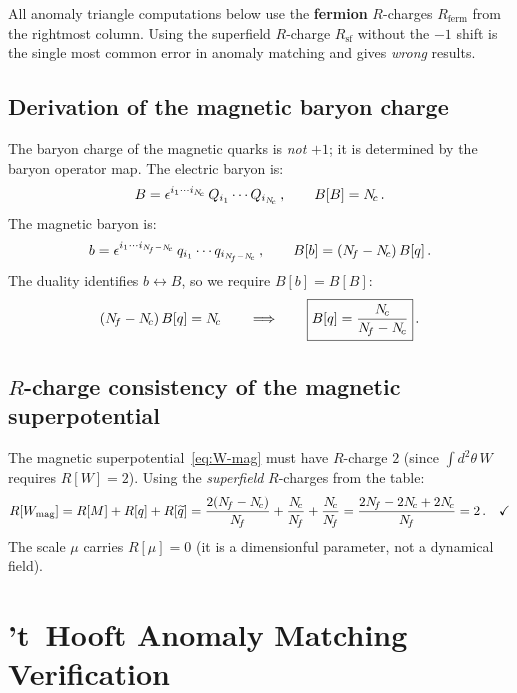 \documentclass[11pt,a4paper]{article}
\begin{document}
\begin{warningbox}[title={Fermion $R$-charges in anomaly matching}]
  All anomaly triangle computations below use the \textbf{fermion} $R$-charges
  $R_{\text{ferm}}$ from the rightmost column.
  Using the superfield $R$-charge $R_{\text{sf}}$ without the $-1$ shift is the
  single most common error in anomaly matching and gives \emph{wrong} results.
\end{warningbox}

\subsection{Derivation of the magnetic baryon charge}

The baryon charge of the magnetic quarks is \emph{not} $+1$; it is determined
by the baryon operator map.  The electric baryon is:
\[
  B = \epsilon^{i_1 \cdots i_{N_{\!c}}}\, Q_{i_1} \cdots Q_{i_{N_{\!c}}}\,,
  \qquad B[B] = N_{\!c}\,.
\]
The magnetic baryon is:
\[
  b = \epsilon^{i_1 \cdots i_{N_{\!f} - N_{\!c}}}\, q_{i_1} \cdots q_{i_{N_{\!f} - N_{\!c}}}\,,
  \qquad B[b] = (N_{\!f} - N_{\!c})\,B[q]\,.
\]
The duality identifies $b \leftrightarrow B$, so we require $B[b] = B[B]$:
\begin{equation}\label{eq:B-charge-q}
  (N_{\!f} - N_{\!c})\,B[q] = N_{\!c}
  \qquad\Longrightarrow\qquad
  \boxed{B[q] = \frac{N_{\!c}}{N_{\!f} - N_{\!c}}}\,.
\end{equation}

\subsection{$R$-charge consistency of the magnetic superpotential}

The magnetic superpotential~\eqref{eq:W-mag} must have $R$-charge $2$ (since
$\int d^2\theta\, W$ requires $R[W] = 2$).  Using the \emph{superfield}
$R$-charges from the table:
\begin{equation}\label{eq:R-Wmag}
  \Rcharge{W_{\text{mag}}} = \Rcharge{M} + \Rcharge{q} + \Rcharge{\widetilde{q}}
  = \frac{2(\Nf - \Nc)}{\Nf} + \frac{\Nc}{\Nf} + \frac{\Nc}{\Nf}
  = \frac{2\Nf - 2\Nc + 2\Nc}{\Nf} = 2\,.
  \quad\checkmark
\end{equation}
The scale $\mu$ carries $R[\mu] = 0$ (it is a dimensionful parameter, not a
dynamical field).


\section{'t~Hooft Anomaly Matching Verification}
\label{sec:anomaly-matching}
\end{document}

